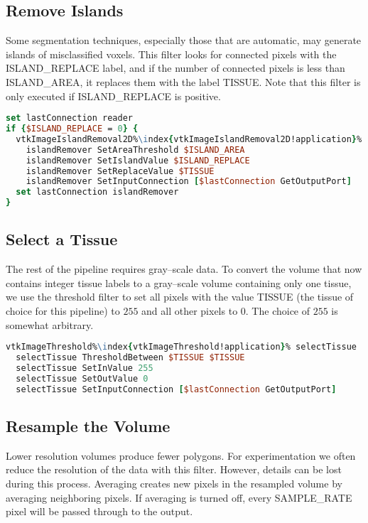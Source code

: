 \subsection{Remove Islands}

Some segmentation techniques, especially those that are automatic, may generate islands of misclassified voxels. This filter looks for connected pixels with the ISLAND\_REPLACE label, and if the number of connected pixels is less than ISLAND\_AREA, it replaces them with the label TISSUE. Note that this filter is only executed if ISLAND\_REPLACE is positive.

\begin{lstlisting}[language=TCL, caption={Remove Islands.}, escapechar=\%]
set lastConnection reader
if {$ISLAND_REPLACE = 0} {
  vtkImageIslandRemoval2D%\index{vtkImageIslandRemoval2D!application}% islandRemover
    islandRemover SetAreaThreshold $ISLAND_AREA
    islandRemover SetIslandValue $ISLAND_REPLACE
    islandRemover SetReplaceValue $TISSUE
    islandRemover SetInputConnection [$lastConnection GetOutputPort]
  set lastConnection islandRemover
}
\end{lstlisting}

\subsection{Select a Tissue}

The rest of the pipeline requires gray--scale data. To convert the volume that now contains integer tissue labels to a gray--scale volume containing only one tissue, we use the threshold filter to set all pixels with the value TISSUE (the tissue of choice for this pipeline) to $255$ and all other pixels to $0$. The choice of $255$ is somewhat arbitrary.

\begin{lstlisting}[language=TCL, caption={Select a Tissue.}, escapechar=\%]
vtkImageThreshold%\index{vtkImageThreshold!application}% selectTissue
  selectTissue ThresholdBetween $TISSUE $TISSUE
  selectTissue SetInValue 255
  selectTissue SetOutValue 0
  selectTissue SetInputConnection [$lastConnection GetOutputPort]
\end{lstlisting}

\subsection{Resample the Volume}

Lower resolution volumes produce fewer polygons. For experimentation we often reduce the resolution of the data with this filter. However, details can be lost during this process. Averaging creates new pixels in the resampled volume by averaging neighboring pixels. If averaging is turned off, every SAMPLE\_RATE pixel will be passed through to the output.

